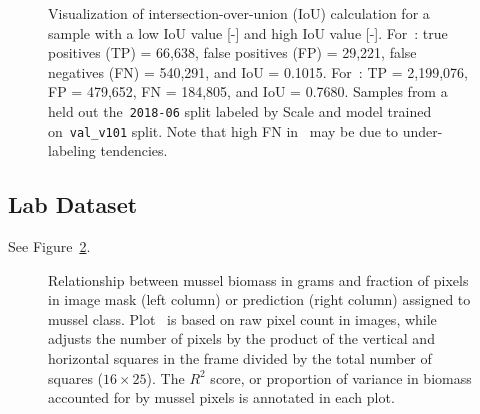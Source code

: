 \documentclass[11pt]{article} %
\begin{document}
\begin{figure}
\centering
{}
\caption{Visualization of intersection-over-union (IoU) calculation for a 
sample with a low IoU value [-] and 
high IoU value [-]. 
For~: true positives (TP) = 66,638, false positives (FP) =
29,221, false negatives (FN) = 540,291, and IoU = 0.1015. 
For~: TP = 2,199,076, FP = 479,652, FN = 184,805, and IoU = 
0.7680. Samples from a held out the~\texttt{2018-06} split labeled by Scale and
model trained on~\texttt{val\_v101} split. Note that high FN 
in~ may be due to under-labeling tendencies.}
\label{fig:iou-example}
\end{figure}


\subsection{Lab Dataset}

See Figure~\ref{fig:lab-to-lab-biomass-from-pixels}.

\newcommand{\labtolab}{./img/lab_to_lab/}

\begin{figure}
\centering
{}
\caption{Relationship between mussel biomass in grams and fraction of pixels in 
image mask (left column) or prediction (right column) assigned to mussel class.
Plot~ is based on raw pixel count in images, 
while~ adjusts the number of pixels by the
product of the vertical and horizontal squares in the frame divided by the 
total number of squares ($16 \times 25$). The $R^2$ score, or proportion of
variance in biomass accounted for by mussel pixels is annotated in each plot.}
\label{fig:lab-to-lab-biomass-from-pixels}
\end{figure}
\end{document}
